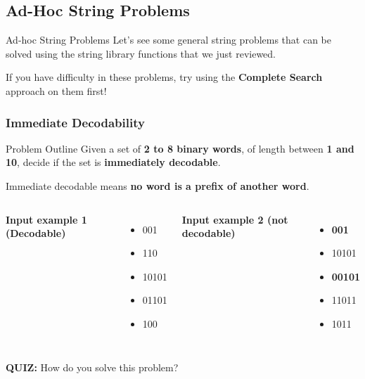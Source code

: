 \subsection{Ad-Hoc String Problems}

\begin{frame}{Ad-hoc String Problems}
  Let's see some general string problems that can be solved using the string library functions that we just reviewed.\bigskip

  If you have difficulty in these problems, try using the {\bf Complete Search} approach on them first!
\end{frame}

\begin{frame}
  \frametitle{Immediate Decodability}
    \begin{exampleblock}{Problem Outline}
      Given a set of {\bf 2 to 8 binary words}, of length
      between {\bf 1 and 10}, decide if the set is {\bf immediately
      decodable}. \bigskip

      Immediate decodable means {\bf no word is a prefix of
      another word}.
    \end{exampleblock}

    \begin{columns}
      {\bf Input example 1 (Decodable)}
      \begin{itemize}
        \item 001
        \item 110
        \item 10101
        \item 01101
        \item 100
      \end{itemize}
      {\bf Input example 2 (not decodable)}
      \begin{itemize}
        \item {\bf 001}
        \item 10101
        \item {\bf 00101}
        \item 11011
        \item 1011
      \end{itemize}
    \end{columns}\medskip

    {\bf QUIZ:} How do you solve this problem?
\end{frame}



